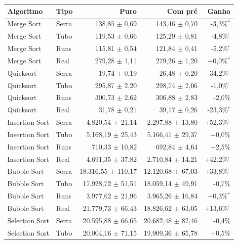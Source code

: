 \footnotesize
\begin{tabular}{llrrr}
\hline
\textbf{Algoritmo} & \textbf{Tipo} & \textbf{Puro} & \textbf{Com pré} & \textbf{Ganho} \\
\hline
Merge Sort & Serra & 138{,}85 $\pm$ 0{,}69 & 143{,}46 $\pm$ 0{,}70 & -3{,}3\%$^{*}$ \\
Merge Sort & Tubo & 119{,}53 $\pm$ 0{,}66 & 125{,}29 $\pm$ 0{,}81 & -4{,}8\%$^{\dagger}$ \\
Merge Sort & Runs & 115{,}81 $\pm$ 0{,}54 & 121{,}84 $\pm$ 0{,}41 & -5{,}2\%$^{\dagger}$ \\
Merge Sort & Real & 279{,}28 $\pm$ 1{,}11 & 279{,}26 $\pm$ 1{,}20 & +0{,}0\%$^{*}$ \\
Quicksort & Serra & 19{,}74 $\pm$ 0{,}19 & 26{,}48 $\pm$ 0{,}20 & -34{,}2\%$^{\dagger}$ \\
Quicksort & Tubo & 295{,}87 $\pm$ 2{,}20 & 298{,}74 $\pm$ 2{,}06 & -1{,}0\%$^{\dagger}$ \\
Quicksort & Runs & 300{,}73 $\pm$ 2{,}62 & 306{,}88 $\pm$ 2{,}83 & -2{,}0\% \\
Quicksort & Real & 31{,}78 $\pm$ 0{,}21 & 39{,}17 $\pm$ 0{,}26 & -23{,}3\%$^{\dagger}$ \\
Insertion Sort & Serra & 4.820{,}54 $\pm$ 21{,}14 & 2.297{,}88 $\pm$ 13{,}80 & +52{,}3\%$^{\dagger}$ \\
Insertion Sort & Tubo & 5.168{,}19 $\pm$ 25{,}43 & 5.166{,}41 $\pm$ 29{,}37 & +0{,}0\% \\
Insertion Sort & Runs & 710{,}33 $\pm$ 10{,}82 & 692{,}84 $\pm$ 4{,}64 & +2{,}5\% \\
Insertion Sort & Real & 4.691{,}35 $\pm$ 37{,}82 & 2.710{,}84 $\pm$ 14{,}21 & +42{,}2\%$^{\dagger}$ \\
Bubble Sort & Serra & 18.316{,}55 $\pm$ 110{,}17 & 12.120{,}68 $\pm$ 67{,}03 & +33{,}8\%$^{\dagger}$ \\
Bubble Sort & Tubo & 17.928{,}72 $\pm$ 51{,}51 & 18.059{,}14 $\pm$ 49{,}91 & -0{,}7\% \\
Bubble Sort & Runs & 3.977{,}62 $\pm$ 21{,}96 & 3.965{,}26 $\pm$ 16{,}84 & +0{,}3\%$^{*}$ \\
Bubble Sort & Real & 21.779{,}73 $\pm$ 66{,}43 & 18.826{,}62 $\pm$ 63{,}05 & +13{,}6\%$^{\dagger}$ \\
Selection Sort & Serra & 20.595{,}88 $\pm$ 66{,}65 & 20.682{,}48 $\pm$ 82{,}46 & -0{,}4\% \\
Selection Sort & Tubo & 20.004{,}16 $\pm$ 71{,}15 & 19.909{,}36 $\pm$ 65{,}78 & +0{,}5\% \\

\end{tabular}
